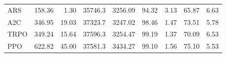 \begin{samepage}
\begin{center}
\begin{tabular}{l|rr|rr|rr|rr}
    ARS          &   158.36 &     1.30 &    35746.3 &    3256.09 &   94.32 &    3.13 &   65.87 &    6.63 \\
    A2C          &   346.95 &    19.03 &    37323.7 &    3247.02 &   98.46 &    1.47 &   73.51 &    5.78 \\
    TRPO         &   349.24 &    15.64 &    37596.3 &    3254.47 &   99.19 &    1.37 &   70.09 &    6.53 \\
    PPO          &   622.82 &    45.00 &    37581.3 &    3434.27 &   99.10 &    1.56 &   75.10 &    5.53 \\
    \bottomrule
  \end{tabular}
\end{center}
\end{samepage}


